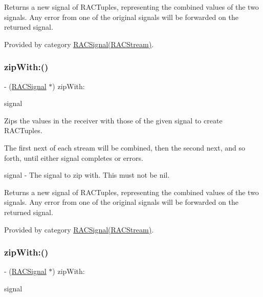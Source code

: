 Returns a new signal of R\+A\+C\+Tuples, representing the combined values of the two signals. Any error from one of the original signals will be forwarded on the returned signal. 

Provided by category \mbox{\hyperlink{category_r_a_c_signal_07_r_a_c_stream_08_ac822f657df311327de76bc55bcae689d}{R\+A\+C\+Signal(\+R\+A\+C\+Stream)}}.

\mbox{\label{interface_r_a_c_signal_ac822f657df311327de76bc55bcae689d}} 
\subsubsection{\texorpdfstring{zip\+With\+:()}{zipWith:()}\hspace{0.1cm}{\footnotesize\ttfamily [2/3]}}
{\footnotesize\ttfamily -\/ (\mbox{\hyperlink{interface_r_a_c_signal}{R\+A\+C\+Signal}} $\ast$) zip\+With\+: \begin{DoxyParamCaption}\item[{(\mbox{\hyperlink{interface_r_a_c_signal}{R\+A\+C\+Signal}} $\ast$)}]{signal }\end{DoxyParamCaption}}

Zips the values in the receiver with those of the given signal to create R\+A\+C\+Tuples.

The first {\ttfamily next} of each stream will be combined, then the second {\ttfamily next}, and so forth, until either signal completes or errors.

signal -\/ The signal to zip with. This must not be {\ttfamily nil}.

Returns a new signal of R\+A\+C\+Tuples, representing the combined values of the two signals. Any error from one of the original signals will be forwarded on the returned signal. 

Provided by category \mbox{\hyperlink{category_r_a_c_signal_07_r_a_c_stream_08_ac822f657df311327de76bc55bcae689d}{R\+A\+C\+Signal(\+R\+A\+C\+Stream)}}.

\mbox{\label{interface_r_a_c_signal_ac822f657df311327de76bc55bcae689d}} 
\subsubsection{\texorpdfstring{zip\+With\+:()}{zipWith:()}\hspace{0.1cm}{\footnotesize\ttfamily [3/3]}}
{\footnotesize\ttfamily -\/ (\mbox{\hyperlink{interface_r_a_c_signal}{R\+A\+C\+Signal}} $\ast$) zip\+With\+: \begin{DoxyParamCaption}\item[{(\mbox{\hyperlink{interface_r_a_c_signal}{R\+A\+C\+Signal}} $\ast$)}]{signal }\end{DoxyParamCaption}}

